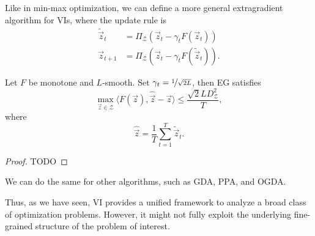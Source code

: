 Like in min-max optimization, we can define a more general extragradient algorithm for VIs, where
the update rule is
\begin{align*}
    \tilde{\vec{z}}_t & = \Pi_{\mathcal{Z}}(\vec{z}_t - \gamma_t F(\vec{z}_t))          \\
    \vec{z}_{t+1}     & = \Pi_{\mathcal{Z}}(\vec{z}_t - \gamma_t F(\tilde{\vec{z}}_t)).
\end{align*}

\begin{theorem}
    Let $F$ be monotone and $L$-smooth. Set $\gamma_t = \nicefrac{1}{\sqrt{2L}}$, then EG satisfies \[
        \max_{\vec{z} \in \mathcal{Z}} \langle F(\vec{z}), \hat{\vec{z}} - \vec{z} \rangle \leq \frac{\sqrt{2} L D_{\mathcal{Z}}^2}{T},
    \]
    where \[
        \hat{\vec{z}} = \frac{1}{T} \sum_{t=1}^{T} \tilde{\vec{z}}_t.
    \]
\end{theorem}

\begin{proof}
    TODO
\end{proof}

We can do the same for other algorithms, such as GDA, PPA, and OGDA.

Thus, as we have seen, VI provides a unified framework to analyze a broad class of optimization
problems. However, it might not fully exploit the underlying fine-grained structure of the problem
of interest.
